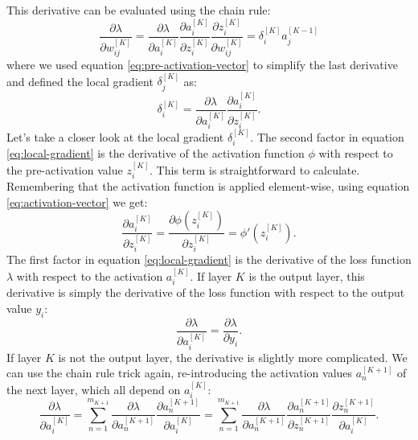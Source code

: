 This derivative can be evaluated using the chain rule:
\begin{equation}
    \frac{\partial \lambda}{\partial w_{ij}^{[K]}} = \frac{\partial \lambda}{\partial a_i^{[K]}} \frac{\partial a_i^{[K]}}{\partial z_i^{[K]}} \frac{\partial z_i^{[K]}}{\partial w_{ij}^{[K]}} = \delta_i^{[K]} a_j^{[K-1]} 
    \label{eq:chain-rule}
\end{equation}
where we used equation \ref{eq:pre-activation-vector} to simplify the last derivative and defined the local gradient $\delta_j^{[K]}$ as:
\begin{equation}
    \delta_i^{[K]} = \frac{\partial \lambda}{\partial a_i^{[K]}} \frac{\partial a_i^{[K]}}{\partial z_i^{[K]}} \text{.}
    \label{eq:local-gradient}
\end{equation}
Let's take a closer look at the local gradient $\delta_i^{[K]}$.
The second factor in equation \ref{eq:local-gradient} is the derivative of the activation function $\phi$ with respect to the pre-activation value $z_i^{[K]}$.
This term is straightforward to calculate. 
Remembering that the activation function is applied element-wise, using equation \ref{eq:activation-vector} we get:
\begin{equation}
    \frac{\partial a_i^{[K]}}{\partial z_i^{[K]}} = \frac{\partial \phi(z_i^{[K]})}{\partial z_i^{[K]}} = \phi'(z_i^{[K]}) \text{.}
    \label{eq:activation-derivative}
\end{equation}
The first factor in equation \ref{eq:local-gradient} is the derivative of the loss function $\lambda$ with respect to the activation $a_i^{[K]}$.
If layer $K$ is the output layer, this derivative is simply the derivative of the loss function with respect to the output value $y_i$:
\begin{equation}
    \frac{\partial \lambda}{\partial a_i^{[K]}} = \frac{\partial \lambda}{\partial y_i} \text{.}
    \label{eq:loss-derivative-output}
\end{equation}
If layer $K$ is not the output layer, the derivative is slightly more complicated.
We can use the chain rule trick again, re-introducing the activation values $a_n^{[K+1]}$ of the next layer, which all depend on $a_i^{[K]}$:
\begin{equation}
    \frac{\partial \lambda}{\partial a_i^{[K]}} = \sum_{n=1}^{m_{K+1}} \frac{\partial \lambda}{\partial a_n^{[K+1]}} \frac{\partial a_n^{[K+1]}}{\partial a_i^{[K]}} = \sum_{n=1}^{m_{K+1}} \frac{\partial \lambda}{\partial a_n^{[K+1]}} \frac{\partial a_n^{[K+1]}}{\partial z_n^{[K+1]}} \frac{\partial z_n^{[K+1]}}{\partial a_i^{[K]}} \text{.}
    \label{eq:loss-derivative-hidden}
\end{equation}
